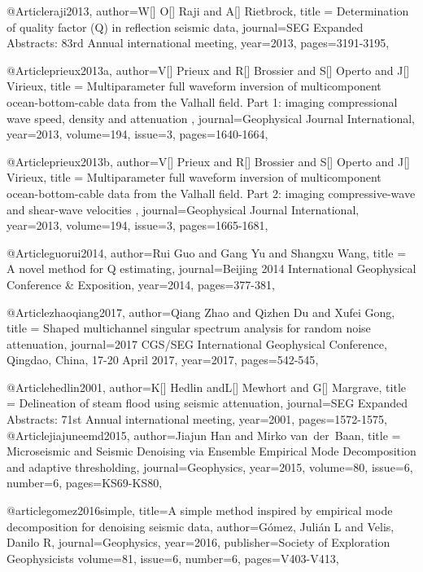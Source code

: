 @Article{raji2013,
  author={W[] O[] Raji and A[] Rietbrock},
  title = {Determination of quality factor (Q) in reflection seismic data},
  journal={SEG Expanded Abstracts: 83rd Annual international meeting},
  year=2013,
  pages={3191-3195},
}

@Article{prieux2013a,
  author={V[] Prieux and R[] Brossier and S[] Operto and J[] Virieux},
  title = {Multiparameter full waveform inversion of multicomponent ocean-bottom-cable data from the Valhall field. {P}art 1: imaging compressional wave speed, density and attenuation },
  journal={Geophysical Journal International},
  year=2013,
  volume=194,
  issue=3,
  pages={1640-1664},
}

@Article{prieux2013b,
  author={V[] Prieux and R[] Brossier and S[] Operto and J[] Virieux},
  title = {Multiparameter full waveform inversion of multicomponent ocean-bottom-cable data from the Valhall field. {P}art 2: imaging compressive-wave and shear-wave velocities },
  journal={Geophysical Journal International},
  year=2013,
  volume=194,
  issue=3,
  pages={1665-1681},
}




@Article{guorui2014,
  author={Rui Guo and Gang Yu and Shangxu Wang},
  title = {A novel method for Q estimating},
  journal={Beijing 2014 International Geophysical Conference \& Exposition},
  year=2014,
  pages={377-381},
}

@Article{zhaoqiang2017,
  author={Qiang Zhao and Qizhen Du and Xufei Gong},
  title = {Shaped multichannel singular spectrum analysis for random noise attenuation},
  journal={2017 CGS/SEG International Geophysical Conference, Qingdao, China, 17-20 April 2017},
  year=2017,
  pages={542-545},
}






@Article{hedlin2001,
  author={K[] Hedlin andL[] Mewhort and G[] Margrave},
  title = {Delineation of steam flood using seismic attenuation},
  journal={SEG Expanded Abstracts: 71st Annual international meeting},
  year=2001,
  pages={1572-1575},
}
@Article{jiajuneemd2015,
  author={Jiajun Han and Mirko van~der~Baan},
  title = {Microseismic and Seismic Denoising via Ensemble Empirical Mode Decomposition and adaptive thresholding},
  journal={Geophysics},
  year=2015,
volume=80,
issue=6,
number=6,
  pages={KS69-KS80},
}

@article{gomez2016simple,
  title={A simple method inspired by empirical mode decomposition for denoising seismic data},
  author={G{\'o}mez, Juli{\'a}n L and Velis, Danilo R},
  journal={Geophysics},
  year={2016},
  publisher={Society of Exploration Geophysicists}
volume=81,
issue=6,
number=6,
  pages={V403-V413},
}

